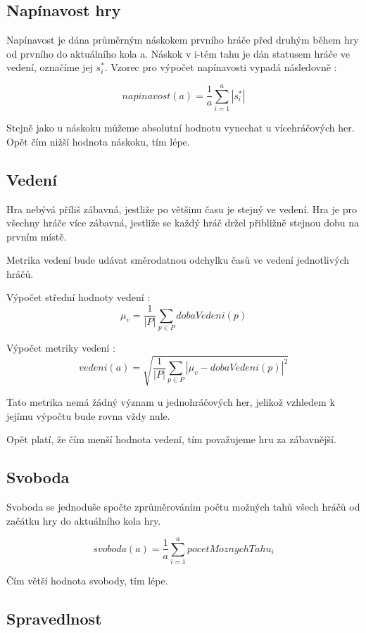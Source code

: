 \subsection{Napínavost hry}
Napínavost je dána průměrným náskokem prvního hráče před druhým během hry od prvního do aktuálního kola a. Náskok v i-tém tahu je dán statusem hráče ve vedení, označíme jej $s^*_i$. Vzorec pro výpočet napínavosti vypadá následovně :

	\[
	napinavost(a) = \frac{1}{a}\sum_{i=1}^a{|s^*_i|}
\]

Stejně jako u náskoku můžeme absolutní hodnotu vynechat u vícehráčových her. Opět čím nižší hodnota náskoku, tím lépe.

\subsection{Vedení}

Hra nebývá příliš zábavná, jestliže po většinu času je stejný ve vedení. Hra je pro všechny hráče více zábavná, jestliže se každý hráč držel přibližně stejnou dobu na prvním místě.

Metrika vedení bude udávat směrodatnou odchylku časů ve vedení jednotlivých hráčů.

Výpočet střední hodnoty vedení :
	\[
	\mu_v = \frac{1}{|P|}\sum_{p \in P} dobaVedeni(p)
\]

Výpočet metriky vedení :
	\[
	vedeni(a) = \sqrt{\frac{1}{|P|}\sum_{p \in P} |\mu_v - dobaVedeni(p)|^2}
\]

Tato metrika nemá žádný význam u jednohráčových her, jelikož vzhledem k jejímu výpočtu bude rovna vždy nule.

Opět platí, že čím menší hodnota vedení, tím považujeme hru za zábavnější.

\subsection{Svoboda}

Svoboda se jednoduše spočte zprůměrováním počtu možných tahů všech hráčů od začátku hry do aktuálního kola hry.

\[
	svoboda(a) = \frac{1}{a}\sum_{i=1}^a{pocetMoznychTahu_i}
\]

Čím větší hodnota svobody, tím lépe.

\subsection{Spravedlnost}


